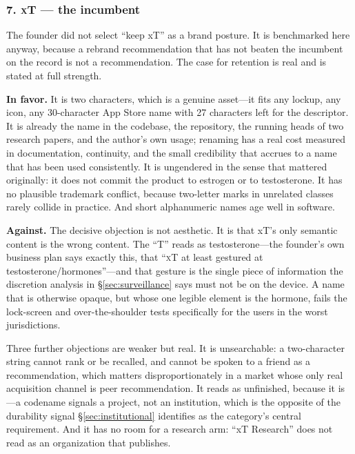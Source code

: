 \documentclass[11pt,a4paper]{article}
\newcommand{\name}[1]{\textsc{#1}}
\begin{document}
\subsubsection*{7. \name{xT} --- the incumbent}
\label{sec:incumbent}

The founder did not select ``keep xT'' as a brand posture. It is
benchmarked here anyway, because a rebrand recommendation that has not
beaten the incumbent on the record is not a recommendation. The case
for retention is real and is stated at full strength.

\textbf{In favor.} It is two characters, which is a genuine asset---it
fits any lockup, any icon, any 30-character App Store name with 27
characters left for the descriptor. It is already the name in the
codebase, the repository, the running heads of two research papers, and
the author's own usage; renaming has a real cost measured in
documentation, continuity, and the small credibility that accrues to a
name that has been used consistently. It is ungendered in the sense
that mattered originally: it does not commit the product to estrogen or
to testosterone. It has no plausible trademark conflict, because
two-letter marks in unrelated classes rarely collide in practice. And
short alphanumeric names age well in software.

\textbf{Against.} The decisive objection is not aesthetic. It is that
xT's only semantic content is the wrong content. The ``T'' reads as
testosterone---the founder's own business plan says exactly this, that
``\name{xT} at least gestured at testosterone/hormones''---and that
gesture is the single piece of information the discretion analysis in
\S\ref{sec:surveillance} says must not be on the device. A name that
is otherwise opaque, but whose one legible element is the hormone,
fails the lock-screen and over-the-shoulder tests specifically for the
users in the worst jurisdictions.

Three further objections are weaker but real. It is unsearchable: a
two-character string cannot rank or be recalled, and cannot be spoken
to a friend as a recommendation, which matters disproportionately in a
market whose only real acquisition channel is peer recommendation. It
reads as unfinished, because it is---a codename signals a project, not
an institution, which is the opposite of the durability signal
\S\ref{sec:institutional} identifies as the category's central
requirement. And it has no room for a research arm: ``xT Research''
does not read as an organization that publishes.
\end{document}
